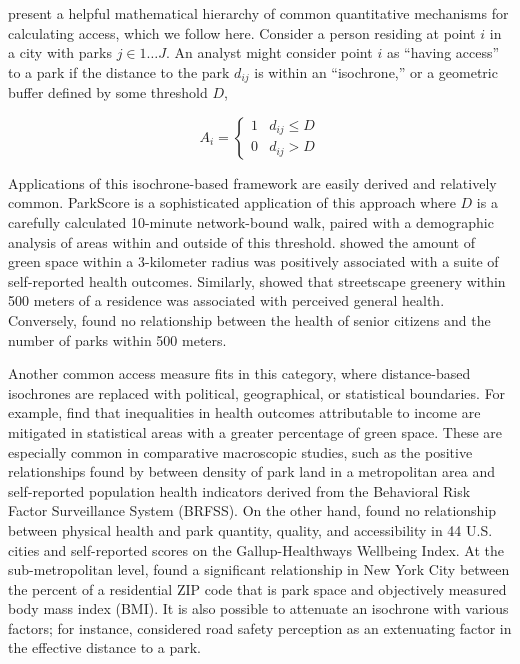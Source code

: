 \documentclass[shortAfour,sageh.bst]{sagej}
\begin{document}
\citet{Dong2006} present a helpful mathematical hierarchy of common
quantitative mechanisms for calculating access, which we follow here.
Consider a person residing at point \(i\) in a city with parks
\(j \in 1 \ldots J\). An analyst might consider point \(i\) as ``having
access'' to a park if the distance to the park \(d_{ij}\) is within an
``isochrone,'' or a geometric buffer defined by some threshold \(D\),

\begin{equation}\label{eq:isochrone}
A_i = \begin{cases} 
      1 & d_{ij}\leq D\\
      0 & d_{ij} > D
   \end{cases}
\end{equation}

Applications of this isochrone-based framework are easily derived and
relatively common. ParkScore \citep{parkscore2019} is a sophisticated
application of this approach where \(D\) is a carefully calculated
10-minute network-bound walk, paired with a demographic analysis of
areas within and outside of this threshold. \citet{devries2003natural}
showed the amount of green space within a 3-kilometer radius was
positively associated with a suite of self-reported health outcomes.
Similarly, \citet{devries2013streetscape} showed that streetscape
greenery within 500 meters of a residence was associated with perceived
general health. Conversely, \citet{carlson2012interactions} found no
relationship between the health of senior citizens and the number of
parks within 500 meters.

Another common access measure fits in this category, where
distance-based isochrones are replaced with political, geographical, or
statistical boundaries. For example, \citet{Mitchell2008} find that
inequalities in health outcomes attributable to income are mitigated in
statistical areas with a greater percentage of green space. These are
especially common in comparative macroscopic studies, such as the
positive relationships found by \citet{West2012} between density of park
land in a metropolitan area and self-reported population health
indicators derived from the Behavioral Risk Factor Surveillance System
(BRFSS). On the other hand, \citet{Larson2016} found no relationship
between physical health and park quantity, quality, and accessibility in
44 U.S. cities and self-reported scores on the Gallup-Healthways
Wellbeing Index. At the sub-metropolitan level, \citet{Stark2014} found
a significant relationship in New York City between the percent of a
residential ZIP code that is park space and objectively measured body
mass index (BMI). It is also possible to attenuate an isochrone with
various factors; for instance, \citet{Dias2019} considered road safety
perception as an extenuating factor in the effective distance to a park.
\end{document}
